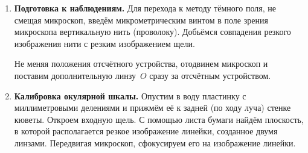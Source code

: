 \documentclass[a4paper]{article}
\begin{document}
\begin{enumerate}
\textbf {Итоговый результат.} Окончательное значение скорости ультразвука в воде при температуре эксперимента:
\begin{equation}
    \boxed{ v = (1483 \pm 66)~\text{м/с}, \quad \varepsilon = 4{,}5\% }.
\end{equation}

\textbf {Сравнение с теорией.}
 Теоретическое значение скорости звука в воде при $20^\circ$C составляет $v_{\text{теор}} \approx 1481$\footnotemark[1] ~м/с. Полученный результат:
\begin{itemize}
    \item Отклонение от теории: $\Delta = |1483 - 1481| = 2$~м/с ($0{,}2\%$);
    \item Отклонение находится в пределах экспериментальной погрешности ($2 < 66$~м/с).
\end{itemize}
Таким образом, экспериментальные данные согласуются с теоретическими предсказаниями в пределах точности измерений.

\textbf {Анализ вклада погрешностей.} Из таблицы~\ref{tab:weighted_avg} видно, что доминирующий вклад в полную погрешность вносит систематическая составляющая ($\sigma_{\text{сист}} \approx 64$~м/с против $\sigma_{\text{сл}} \approx 17$~м/с). Это связано с тем, что погрешность длины волны красного света составляет $\approx 3$ \%, а также мы измеряли частоту генератора непосредственно когда выставляли ее (поскольку частотомер

\subsection{Определение скорости ультразвука методом тёмного поля}

\item \textbf {Подготовка к наблюдениям.} Для перехода к методу тёмного поля, не смещая микроскоп, введём микрометрическим винтом в поле зрения микроскопа вертикальную нить (проволоку). Добьёмся совпадения резкого изображения нити с резким изображением щели.

Не меняя положения отсчётного устройства, отодвинем микроскоп и поставим дополнительную линзу~$O$ сразу за отсчётным устройством.

\item \textbf {Калибровка окулярной шкалы.} Опустим в воду пластинку с миллиметровыми делениями и прижмём её к задней (по ходу луча) стенке кюветы. Откроем входную щель. С помощью листа бумаги найдём плоскость, в которой располагается резкое изображение линейки, созданное двумя линзами. Передвигая микроскоп, сфокусируем его на изображение линейки.


\end{enumerate}
\end{document}
